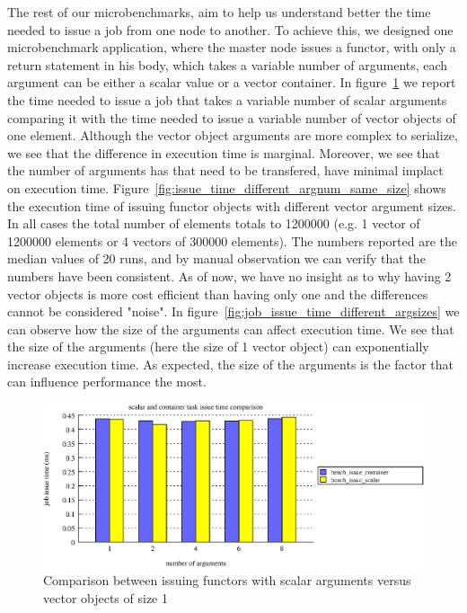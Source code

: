 	The rest of our microbenchmarks, aim to help us understand better the time needed to issue a job from one
node to another.  To achieve this, we designed one microbenchmark application, where the master node issues
a functor, with only a return statement in his body, which takes a variable number of arguments, each argument
can be either a scalar value or a vector container.  In figure~\ref{fig:issue_time_scalar_vs_containers} we report
the time needed to issue a job that takes a variable number of scalar arguments comparing it with the time needed
to issue a variable number of vector objects of one element.  Although the vector object arguments are more complex
to serialize, we see that the difference in execution time is marginal.  Moreover, we see that the number of arguments
has that need to be transfered, have minimal implact on execution time.  
Figure~\ref{fig:issue_time_different_argnum_same_size} shows the execution time of issuing functor objects with different
vector argument sizes.  In all cases the total number of elements totals to 1200000 (e.g. 1 vector of 1200000 elements or
4 vectors of 300000 elements).   The numbers reported are the median values of 20 runs, and by manual observation 
we can verify that the numbers have been consistent.
As of now, we have no insight as to why having 2 vector objects is more cost efficient
than having only one and the differences cannot be considered "noise". In figure~\ref{fig:job_issue_time_different_argsizes}
we can observe how the size of the arguments can affect execution time.  We see that the size of the arguments (here the 
size of 1 vector object) can exponentially increase execution time.  As expected, the size of the arguments is the factor
that can influence performance the most.

\begin{figure}[!ht]
\includegraphics[width=\columnwidth]{figures/job_issue_time_scalar_vs_container_bars}
\caption{Comparison between issuing functors with scalar arguments versus vector objects of size 1}
\label{fig:issue_time_scalar_vs_containers}
\end{figure}

